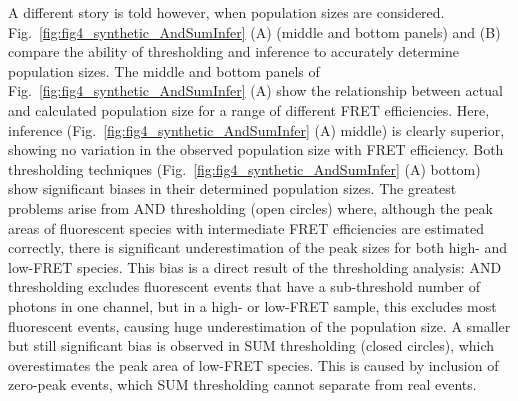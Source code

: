 A different story is told however, when population sizes are considered. Fig.~\ref{fig:fig4_synthetic_AndSumInfer} (A) (middle and bottom panels) and (B) compare the ability of thresholding and inference to accurately determine population sizes. The middle and bottom panels of Fig.~\ref{fig:fig4_synthetic_AndSumInfer} (A) show the relationship between actual and calculated population size for a range of different FRET efficiencies.  Here, inference (Fig.~\ref{fig:fig4_synthetic_AndSumInfer} (A) middle) is clearly superior, showing no variation in the observed population size with FRET efficiency. Both thresholding techniques (Fig.~\ref{fig:fig4_synthetic_AndSumInfer} (A) bottom) show significant biases in their determined population sizes.  The greatest problems arise from AND thresholding (open circles) where, although the peak areas of fluorescent species with intermediate FRET efficiencies are estimated correctly, there is significant underestimation of the peak sizes for both high- and low-FRET species.  This bias is a direct result of the thresholding analysis: AND thresholding excludes fluorescent events that have a sub-threshold number of photons in one channel, but in a high- or low-FRET sample, this excludes most fluorescent events, causing huge underestimation of the population size.  A smaller but still significant bias is observed in SUM thresholding (closed circles), which overestimates the peak area of low-FRET species.  This is caused by inclusion of zero-peak events, which SUM thresholding cannot separate from real events. 

